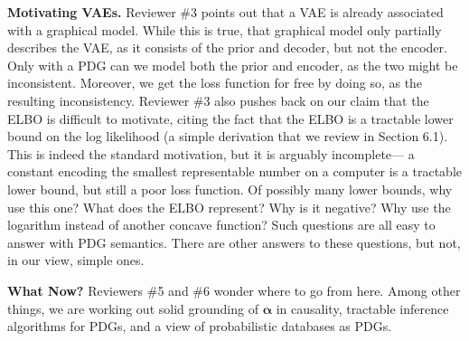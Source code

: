 \documentclass{article}
\theoremstyle{plain}
\theoremstyle{definition}
\newcommand{\balpha}{\boldsymbol\alpha}
\newcommand\revc[1]{{\color{revcolor}#1}}
\begin{document}
\textbf{Motivating VAEs.}
\revc{Reviewer \#3} points out that a VAE is already associated with a graphical model.
While this is true, that graphical model only partially describes the VAE, as it consists of the prior and decoder, but not the encoder.
Only with a PDG can we model both the prior and encoder, as the two might be inconsistent.
Moreover, we get the loss function for free by doing so, as the resulting inconsistency.
%
%
\revc{Reviewer \#3} also pushes back on our claim that the ELBO is difficult to motivate,
citing
the fact that the ELBO is a tractable lower bound on the log likelihood (a simple derivation that we review in Section 6.1).  This is indeed the standard motivation,
but it is arguably incomplete---%
a constant encoding the smallest representable number on a computer
is a tractable lower bound,
but still a poor loss function.
Of possibly many lower bounds, why use this one? What does the ELBO represent?
Why is it negative?
Why use the logarithm instead of another concave function?
Such questions are all easy to answer with PDG semantics. There are other answers to these questions, but not, in our view, simple ones.


\textbf{What Now?} \revc{Reviewers \#5 and \#6} wonder where to go from here. Among other things, we are working out solid grounding of $\balpha$ in causality,  tractable inference algorithms for PDGs, and a view of probabilistic databases as PDGs.



\end{document}
